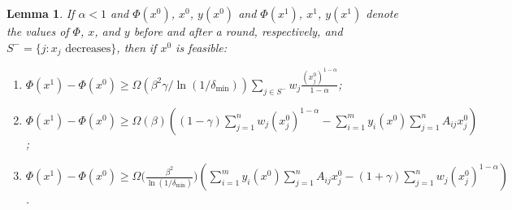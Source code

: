 \documentclass[11pt]{article}
\newtheorem{lemma}[theorem]{Lemma}
\begin{document}
\begin{lemma}\label{lemma:potential-increase-alpha<1}
If $\alpha<1$ and $\Phi(x^0)$, $x^0$, $y(x^0)$ and $\Phi(x^1)$, $x^1$, $y(x^1)$ denote the values of $\Phi$, $x$, and $y$ before and after a round, respectively, and $S^- = \{j: x_j \text{ decreases}\}$, then if $x^0$ is feasible:
\begin{enumerate}
\item $\Phi(x^1) - \Phi(x^0)\geq \Omega(\beta^2\gamma/\ln(1/\delta_{\min}))\sum_{j\in S^-}w_j \frac{{(x_j^0)}^{1-\alpha}}{1-\alpha}$;
\item $\Phi(x^1) - \Phi(x^0) \geq \Omega(\beta)\left((1-\gamma)\sum_{j=1}^n w_j{(x_j^0)^{1-\alpha}} - \sum_{i=1}^m y_i(x^0) \sum_{j=1}^n A_{ij}x_j^0\right)$;
\item $\Phi(x^1) - \Phi(x^0) \geq \Omega\Big(\frac{\beta^2}{\ln(1/\delta_{\min})}\Big)\left(\sum_{i=1}^m y_i(x^0) \sum_{j=1}^n A_{ij}x_j^0 - (1+\gamma)\sum_{j=1}^n w_j{(x_j^0)^{1-\alpha}}\right)$.
\end{enumerate}
\end{lemma}
\end{document}
